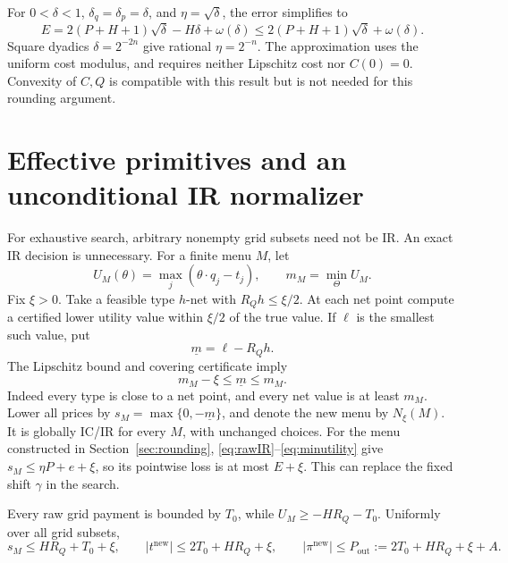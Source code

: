 \documentclass[11pt,a4paper]{article}
\numberwithin{equation}{section}
\begin{document}
For \(0<\delta<1\), \(\delta_q=\delta_p=\delta\), and
\(\eta=\sqrt\delta\), the error simplifies to
\begin{equation}\label{eq:sqrtrate}
 E=2(P+H+1)\sqrt\delta-H\delta+\omega(\delta)
 \le2(P+H+1)\sqrt\delta+\omega(\delta).
\end{equation}
Square dyadics \(\delta=2^{-2n}\) give rational \(\eta=2^{-n}\).
The approximation uses the uniform cost modulus, and requires neither
Lipschitz cost nor \(C(0)=0\). Convexity of \(C,Q\) is compatible with
this result but is not needed for this rounding argument.

\section{Effective primitives and an unconditional IR normalizer}
\label{sec:effective}
For exhaustive search, arbitrary nonempty grid subsets need not be IR.
An exact IR decision is unnecessary.
For a finite menu \(M\), let
\[
 U_M(\theta)=\max_j(\theta\cdot q_j-t_j),\qquad
 m_M=\min_\Theta U_M.
\]
Fix \(\xi>0\). Take a feasible type \(h\)-net with \(R_Qh\le\xi/2\).
At each net point compute a certified lower utility value within
\(\xi/2\) of the true value. If \(\ell\) is the smallest such value, put
\[
 \underline m=\ell-R_Qh.
\]
The Lipschitz bound and covering certificate imply
\begin{equation}\label{eq:minutility}
 m_M-\xi\le\underline m\le m_M.
\end{equation}
Indeed every type is close to a net point, and every net value is at
least \(m_M\). Lower all prices by
\(s_M=\max\{0,-\underline m\}\), and denote the new menu by \(N_\xi(M)\).
It is globally IC/IR for every \(M\), with unchanged choices.
For the menu constructed in Section~\ref{sec:rounding},
\eqref{eq:rawIR}--\eqref{eq:minutility} give
\(s_M\le\eta P+e+\xi\), so its pointwise loss is at most \(E+\xi\).
This can replace the fixed shift \(\gamma\) in the search.

Every raw grid payment is bounded by \(T_0\), while
\(U_M\ge-HR_Q-T_0\). Uniformly over all grid subsets,
\begin{equation}\label{eq:outbounds}
 s_M\le HR_Q+T_0+\xi,\qquad
 |t^{\mathrm{new}}|\le2T_0+HR_Q+\xi,\qquad
 |\pi^{\mathrm{new}}|\le P_{\mathrm{out}}:=2T_0+HR_Q+\xi+A.
\end{equation}
\end{document}
